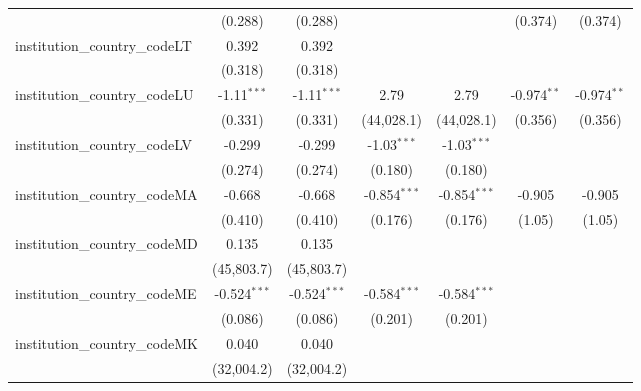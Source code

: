 \begin{tabular}{lcccccc}
                                         & (0.288)        & (0.288)        &                &                & (0.374)        & (0.374)\\   
   institution\_country\_codeLT          & 0.392          & 0.392          &                &                &                &   \\   
                                         & (0.318)        & (0.318)        &                &                &                &   \\   
   institution\_country\_codeLU          & -1.11$^{***}$  & -1.11$^{***}$  & 2.79           & 2.79           & -0.974$^{**}$  & -0.974$^{**}$\\   
                                         & (0.331)        & (0.331)        & (44,028.1)     & (44,028.1)     & (0.356)        & (0.356)\\   
   institution\_country\_codeLV          & -0.299         & -0.299         & -1.03$^{***}$  & -1.03$^{***}$  &                &   \\   
                                         & (0.274)        & (0.274)        & (0.180)        & (0.180)        &                &   \\   
   institution\_country\_codeMA          & -0.668         & -0.668         & -0.854$^{***}$ & -0.854$^{***}$ & -0.905         & -0.905\\   
                                         & (0.410)        & (0.410)        & (0.176)        & (0.176)        & (1.05)         & (1.05)\\   
   institution\_country\_codeMD          & 0.135          & 0.135          &                &                &                &   \\   
                                         & (45,803.7)     & (45,803.7)     &                &                &                &   \\   
   institution\_country\_codeME          & -0.524$^{***}$ & -0.524$^{***}$ & -0.584$^{***}$ & -0.584$^{***}$ &                &   \\   
                                         & (0.086)        & (0.086)        & (0.201)        & (0.201)        &                &   \\   
   institution\_country\_codeMK          & 0.040          & 0.040          &                &                &                &   \\   
                                         & (32,004.2)     & (32,004.2)     &                &                &                &   \\   

\end{tabular}
